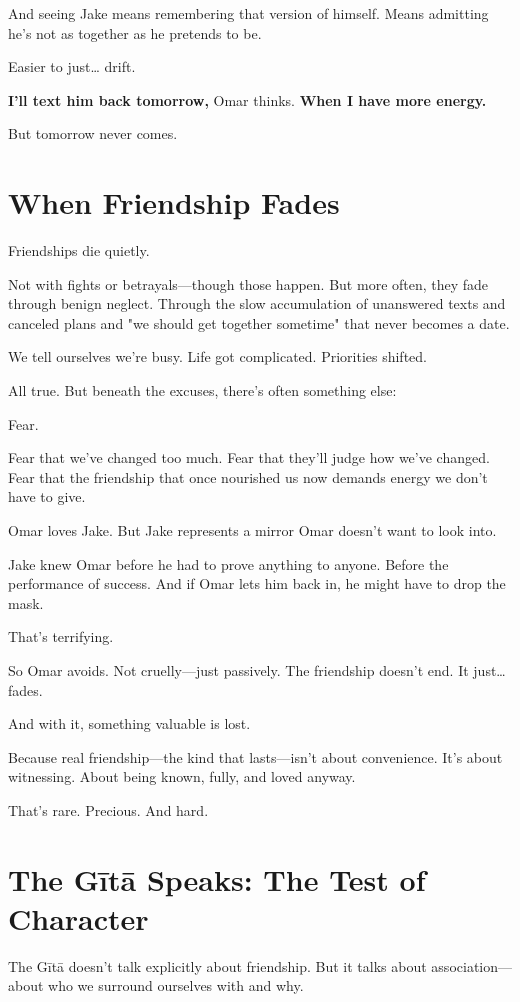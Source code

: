 \documentclass[11pt,twoside]{book}
\begin{document}
And seeing Jake means remembering that version of himself. Means admitting he's not as together as he pretends to be.

Easier to just\ldots{} drift.

\textbf{I'll text him back tomorrow,} Omar thinks. \textbf{When I have more energy.}

But tomorrow never comes.

\section*{When Friendship Fades}

Friendships die quietly.

Not with fights or betrayals—though those happen. But more often, they fade through benign neglect. Through the slow accumulation of unanswered texts and canceled plans and "we should get together sometime" that never becomes a date.

We tell ourselves we're busy. Life got complicated. Priorities shifted.

All true. But beneath the excuses, there's often something else:

Fear.

Fear that we've changed too much. Fear that they'll judge how we've changed. Fear that the friendship that once nourished us now demands energy we don't have to give.

Omar loves Jake. But Jake represents a mirror Omar doesn't want to look into.

Jake knew Omar before he had to prove anything to anyone. Before the performance of success. And if Omar lets him back in, he might have to drop the mask.

That's terrifying.

So Omar avoids. Not cruelly—just passively. The friendship doesn't end. It just\ldots{} fades.

And with it, something valuable is lost.

Because real friendship—the kind that lasts—isn't about convenience. It's about witnessing. About being known, fully, and loved anyway.

That's rare. Precious. And hard.

\section*{The Gītā Speaks: The Test of Character}

The Gītā doesn't talk explicitly about friendship. But it talks about association—about who we surround ourselves with and why.
\end{document}
